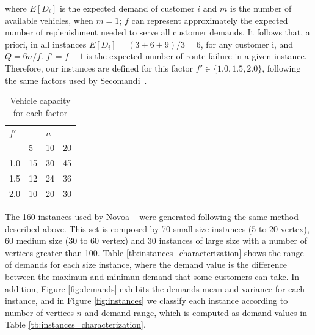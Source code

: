 where $E[D_i]$ is the expected demand of customer $i$ and $m$ is the number of available vehicles, when $m = 1$; $f$ can represent approximately the expected number of replenishment needed to serve all customer demands. It follows that, a priori, in all instances $E[D_i]=(3+6+9)/3=6$, for any customer i, and $Q=6n/f$. $f'=f-1$ is the expected number of route failure in a given instance. Therefore, our instances are defined for this factor $f' \in \{1.0, 1.5, 2.0\}$, following the same factors used by Secomandi~\cite{secomandi_comparing_2000}.

\begin{table}[!h]
  \centering
  \caption{Vehicle capacity for each factor}\label{tb:Q}
\begin{tabular}{l l l l}
  \hline
  $f'$ &   & $n$ &   \\
  \cline{2-4}
      & 5 & 10 & 20 \\
  \hline
  1.0 & 15 & 30 & 45 \\
  1.5 & 12 & 24 & 36 \\
  2.0 & 10 & 20 & 30 \\
  \hline
\end{tabular}
\end{table}



The 160 instances used by Novoa ~\cite{novoa_approximate_2009} were generated following the same method described above. This set is composed by 70 small size instances (5 to 20 vertex), 60 medium size (30 to 60 vertex) and 30 instances of large size with a number of vertices greater than 100. Table \ref{tb:instances_characterization} shows the range of demands for each size instance, where the demand value is the difference between the maximun and minimun demand that some customers can take. In addition, Figure \ref{fig:demands} exhibits the demands mean and variance for each instance, and in Figure \ref{fig:instances} we classify each instance according to number of vertices $n$ and demand range, which is computed as demand values in Table \ref{tb:instances_characterization}.


